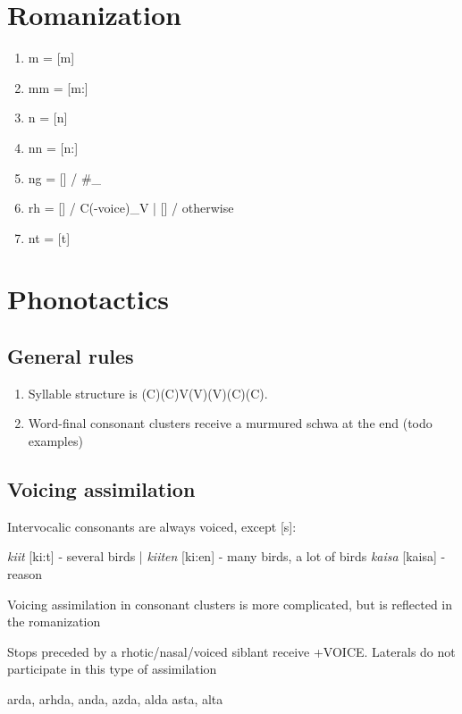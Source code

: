 \documentclass[8pt]{book}
\begin{document}
\section{Romanization}
\begin{enumerate}
\item m = [m]
\item mm = [m:]
\item n = [n]
\item nn = [n:]
\item ng = [] / \#\_
\item rh = [] / C(-voice)\_V | [] / otherwise
\item nt = [t]
\end{enumerate}

\section{Phonotactics}
\subsection{General rules}
\begin{enumerate}
	\item Syllable structure is (C)(C)V(V)(V)(C)(C).
	\item Word-final consonant clusters receive a murmured schwa at the end (todo examples)
\end{enumerate}


\subsection{Voicing assimilation}
Intervocalic consonants are always voiced, except [s]:
\begin{xlista}
\ex \textit{kiit} [ki:t] - several birds | \textit{kiiten} [ki:en] - many birds, a lot of birds
\ex \textit{kaisa} [kaisa] - reason
\end{xlista}

Voicing assimilation in consonant clusters is more complicated, but is reflected in the romanization

Stops preceded by a rhotic/nasal/voiced siblant receive +VOICE. Laterals do not participate in this type of assimilation
\begin{exe}
	\ex arda, arhda, anda, azda, alda
	\ex asta, alta
	
\end{exe}
\end{document}
